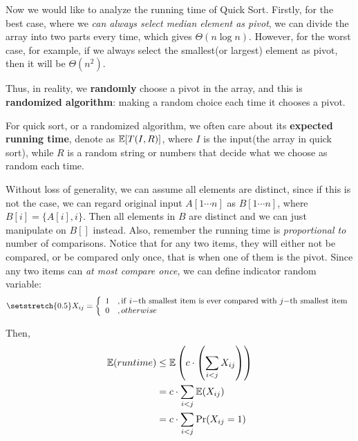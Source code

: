 \documentclass[11pt, a4paper]{COMP3711}
\begin{document}
\begin{spacing}{1.5}
    Now we would like to analyze the running time of Quick Sort.
    Firstly, for the best case, where we {\it can always 
    select median element as pivot}, we can divide the array 
    into two parts every time, which gives $\Theta(n\log n)$.
    However, for the worst case, for example, if we always select 
    the smallest(or largest) element as pivot, then 
    it will be $\Theta(n^2)$.

    Thus, in reality, we {\bf randomly} choose a pivot in the 
    array, and this is {\bf randomized algorithm}: making 
    a random choice each time it chooses a pivot.

    For quick sort, or a randomized algorithm, we often care about 
    its {\bf expected running time}, denote as $\mathbb{E}[T(I,R)]$, 
    where $I$ is the input(the array in quick sort), while $R$ is 
    a random string or numbers that decide what we choose as 
    random each time.

    Without loss of generality, we can assume all elements are 
    distinct, since if this is not the case, we can regard 
    original input $A[1\cdots n]$ as $B[1\cdots n]$, where 
    $B[i]=\{A[i], i\}$. Then all elements in $B$ are distinct 
    and we can just manipulate on $B[]$ instead. 
    Also, remember the running time is {\it proportional to}
    number of comparisons. Notice that for any two items, 
    they will either not be compared, or be compared only once,
    that is when one of them is the pivot.
    Since any two items can {\it at most compare once},
    we can define indicator random variable: 
    \begin{align*}
        \setstretch{0.5}
        X_{ij}=\left\{ 
            \begin{array}{ll}
                1 &, {\rm if\ } i{\rm -th\ smallest\ item\ is\ ever\ compared 
                \ with\ }j{\rm -th\ smallest\ item}\\
                0 &, otherwise
            \end{array}
        \right.
    \end{align*}

    Then,
    \begin{align*}
        \mathbb{E}(runtime)&\le \mathbb{E}\left(c\cdot \left(\sum_{i<j}X_{ij}\right)\right)\\
        &=c\cdot \sum_{i<j} \mathbb{E}(X_{ij})\\
        &=c\cdot \sum_{i<j} \Pr(X_{ij}=1)
    \end{align*}
    

\end{spacing}
\end{document}

